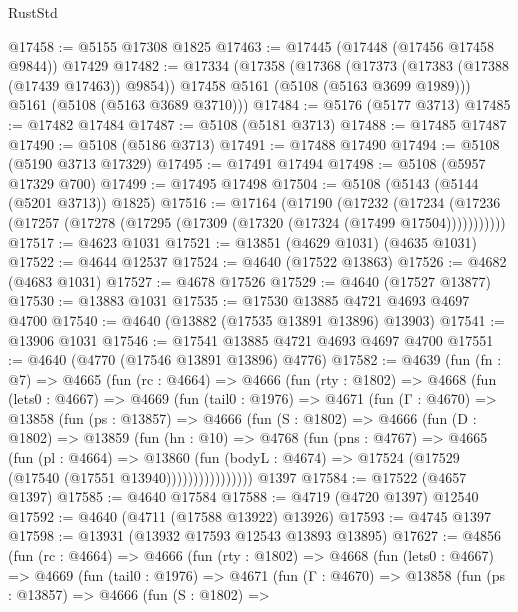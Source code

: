 \begin{lexlean}{RustStd}
\begin{coremodule}
@17458 := @5155 @17308 @1825
@17463 := @17445 (@17448 (@17456 @17458 @9844)) @17429
@17482 := @17334
    (@17358
      (@17368
        (@17373 (@17383 (@17388 (@17439 @17463)) @9854))
        @17458
        @5161
        (@5108 (@5163 @3699 @1989)))
      @5161
      (@5108 (@5163 @3689 @3710)))
@17484 := @5176 (@5177 @3713)
@17485 := @17482 @17484
@17487 := @5108 (@5181 @3713)
@17488 := @17485 @17487
@17490 := @5108 (@5186 @3713)
@17491 := @17488 @17490
@17494 := @5108 (@5190 @3713 @17329)
@17495 := @17491 @17494
@17498 := @5108 (@5957 @17329 @700)
@17499 := @17495 @17498
@17504 := @5108 (@5143 (@5144 (@5201 @3713)) @1825)
@17516 := @17164
    (@17190
      (@17232
        (@17234 (@17236 (@17257 (@17278 (@17295 (@17309 (@17320 (@17324 (@17499 @17504)))))))))))
@17517 := @4623 @1031
@17521 := @13851 (@4629 @1031) (@4635 @1031)
@17522 := @4644 @12537
@17524 := @4640 (@17522 @13863)
@17526 := @4682 (@4683 @1031)
@17527 := @4678 @17526
@17529 := @4640 (@17527 @13877)
@17530 := @13883 @1031
@17535 := @17530 @13885 @4721 @4693 @4697 @4700
@17540 := @4640 (@13882 (@17535 @13891 @13896) @13903)
@17541 := @13906 @1031
@17546 := @17541 @13885 @4721 @4693 @4697 @4700
@17551 := @4640 (@4770 (@17546 @13891 @13896) @4776)
@17582 := @4639
    (fun (fn : @7) =>
    @4665
      (fun (rc : @4664) =>
      @4666
        (fun (rty : @1802) =>
        @4668
          (fun (lets0 : @4667) =>
          @4669
            (fun (tail0 : @1976) =>
            @4671
              (fun (Γ : @4670) =>
              @13858
                (fun (ps : @13857) =>
                @4666
                  (fun (S : @1802) =>
                  @4666
                    (fun (D : @1802) =>
                    @13859
                      (fun (hn : @10) =>
                      @4768
                        (fun (pns : @4767) =>
                        @4665
                          (fun (pl : @4664) =>
                          @13860
                            (fun (bodyL : @4674) =>
                            @17524 (@17529 (@17540 (@17551 @13940))))))))))))))))
    @1397
@17584 := @17522 (@4657 @1397)
@17585 := @4640 @17584
@17588 := @4719 (@4720 @1397) @12540
@17592 := @4640 (@4711 (@17588 @13922) @13926)
@17593 := @4745 @1397
@17598 := @13931 (@13932 @17593 @12543 @13893 @13895)
@17627 := @4856
    (fun (rc : @4664) =>
    @4666
      (fun (rty : @1802) =>
      @4668
        (fun (lets0 : @4667) =>
        @4669
          (fun (tail0 : @1976) =>
          @4671
            (fun (Γ : @4670) =>
            @13858
              (fun (ps : @13857) =>
              @4666
                (fun (S : @1802) =>

\end{coremodule}
\end{lexlean}
